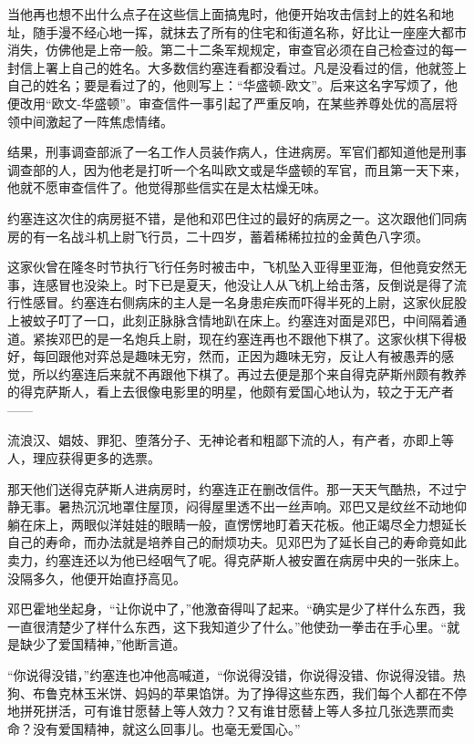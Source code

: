 当他再也想不出什么点子在这些信上面搞鬼时，他便开始攻击信封上的姓名和地址，随手漫不经心地一挥，就抹去了所有的住宅和街道名称，好比让一座座大都市消失，仿佛他是上帝一般。第二十二条军规规定，审查官必须在自己检查过的每一封信上署上自己的姓名。大多数信约塞连看都没看过。凡是没看过的信，他就签上自己的姓名；要是看过了的，他则写上：“华盛顿-欧文”。后来这名字写烦了，他便改用“欧文-华盛顿”。审查信件一事引起了严重反响，在某些养尊处优的高层将领中间激起了一阵焦虑情绪。




结果，刑事调查部派了一名工作人员装作病人，住进病房。军官们都知道他是刑事调查部的人，因为他老是打听一个名叫欧文或是华盛顿的军官，而且第一天下来，他就不愿审查信件了。他觉得那些信实在是太枯燥无味。

约塞连这次住的病房挺不错，是他和邓巴住过的最好的病房之一。这次跟他们同病房的有一名战斗机上尉飞行员，二十四岁，蓄着稀稀拉拉的金黄色八字须。

这家伙曾在隆冬时节执行飞行任务时被击中，飞机坠入亚得里亚海，但他竟安然无事，连感冒也没染上。时下已是夏天，他没让人从飞机上给击落，反倒说是得了流行性感冒。约塞连右侧病床的主人是一名身患疟疾而吓得半死的上尉，这家伙屁股上被蚊子叮了一口，此刻正脉脉含情地趴在床上。约塞连对面是邓巴，中间隔着通道。紧挨邓巴的是一名炮兵上尉，现在约塞连再也不跟他下棋了。这家伙棋下得极好，每回跟他对弈总是趣味无穷，然而，正因为趣味无穷，反让人有被愚弄的感觉，所以约塞连后来就不再跟他下棋了。再过去便是那个来自得克萨斯州颇有教养的得克萨斯人，看上去很像电影里的明星，他颇有爱国心地认为，较之于无产者——

流浪汉、娼妓、罪犯、堕落分子、无神论者和粗鄙下流的人，有产者，亦即上等人，理应获得更多的选票。

那天他们送得克萨斯人进病房时，约塞连正在删改信件。那一天天气酷热，不过宁静无事。暑热沉沉地罩住屋顶，闷得屋里透不出一丝声响。邓巴又是纹丝不动地仰躺在床上，两眼似洋娃娃的眼睛一般，直愣愣地盯着天花板。他正竭尽全力想延长自己的寿命，而办法就是培养自己的耐烦功夫。见邓巴为了延长自己的寿命竟如此卖力，约塞连还以为他已经咽气了呢。得克萨斯人被安置在病房中央的一张床上。没隔多久，他便开始直抒高见。

邓巴霍地坐起身，“让你说中了，”他激奋得叫了起来。“确实是少了样什么东西，我一直很清楚少了样什么东西，这下我知道少了什么。”他使劲一拳击在手心里。“就是缺少了爱国精神，”他断言道。




“你说得没错，”约塞连也冲他高喊道，“你说得没错，你说得没错、你说得没错。热狗、布鲁克林玉米饼、妈妈的苹果馅饼。为了挣得这些东西，我们每个人都在不停地拼死拼活，可有谁甘愿替上等人效力？又有谁甘愿替上等人多拉几张选票而卖命？没有爱国精神，就这么回事儿。也毫无爱国心。”

